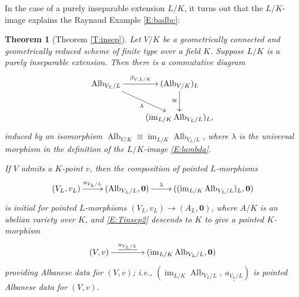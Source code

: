 \documentclass[11pt, reqno]{amsart}
\numberwithin{equation}{section}
\newtheorem{teo}{Theorem}[section]
\theoremstyle{definition}
\theoremstyle{remark}
\DeclareMathOperator{\im}{im}
\def\iso{\cong}
\newcommand{\ubar}[1]{{\underline{#1}}}
\DeclareMathOperator{\alb}{Alb}
\begin{document}
In the case of a purely inseparable extension $L/K$, it turns out that the $L/K$-image explains the Raynaud Example \ref{E:badbc}:

 \begin{teo}[{Theorem \ref{T:insep}}]
  \label{L:albBCinsep}
  Let $V/K$ be a geometrically connected and geometrically reduced 
  scheme of finite type over a field $K$.  Suppose $L/K$ is a       purely inseparable extension.
Then there is a commutative diagram
      \begin{equation}\label{E:TinsepE2}
  \xymatrix{
\operatorname{Alb}_{V_L/L}  \ar[r]^<>(0.5){\beta_{V,L/K}}   \ar[rd]_<>(0.5){\lambda}& (\operatorname{Alb}_{V/K})_L \ar[d]_{\iso}\\
 & (\im_{L/K}\alb_{V_L/L})_L,
}
\end{equation}  
induced by an isomorphism $  \alb_{V/K} \iso \im_{L/K}\alb_{V_L/L}$, where $\lambda$ is the universal morphism in the definition of the $L/K$-image \eqref{E:lambda}.
        
  
 If $V$ admits a $K$-point $v$, then  the composition of pointed $L$-morphisms
  \begin{equation}\label{E:Tinsep2}
\xymatrix{
(V_L,v_L) \ar[r]^<>(0.5){a_{V_L/L}}& (\operatorname{Alb}_{V_L/L},\mathbf 0)  \ar[r]^<>(0.5){\lambda}& ((\im_{L/K}\operatorname{Alb}_{V_L/L})_L,\mathbf 0)
}
\end{equation}
is initial for pointed $L$-morphisms $(V_L,v_L)\to (A_L,\mathbf 0 )$, where $A/K$ is an abelian variety over $K$, 
and  \eqref{E:Tinsep2}
descends to $K$ to give a  pointed $K$-morphism
\begin{equation}\label{E:Tinsep3}
\xymatrix@C=4em{
(V,v) \ar[r]^<>(0.5){\ubar {a_{V_L/L}}}& (\im_{L/K}\operatorname{Alb}_{V_L/L},\mathbf 0)
}
\end{equation}
providing Albanese data for $(V,v)$; \emph{i.e.}, $(\im_{L/K}\operatorname{Alb}_{V_L/L},\  \ubar {a_{V_L/L}})$ is pointed Albanese data for $(V,v)$.  
                            \end{teo}
\end{document}
